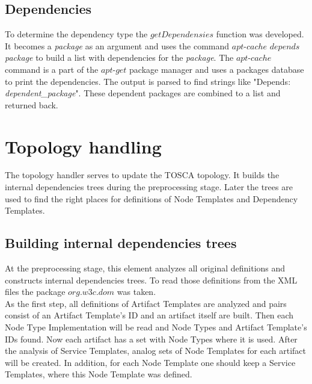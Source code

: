 \subsection*{Dependencies}
To determine the dependency type the $getDependensies$ function was developed.
It becomes a \emph{package} as an argument and uses the command $apt$-$cache$ $depends$ \emph{package} to build a list with dependencies for the \emph{package}. 
The $apt$-$cache$ command is a part of the $apt$-$get$ package manager and uses a packages database to print the dependencies.
The output is parsed to find strings like "Depends: \emph{dependent\_package}".
These dependent packages are combined to a list and returned back.

\section{Topology handling}\label{sec:imptophan}
The topology handler serves to update the TOSCA topology.
It builds the internal dependencies trees during the preprocessing stage.
Later the trees are used to find the right places for definitions of Node Templates and Dependency Templates.

\subsection*{Building internal dependencies trees}
At the preprocessing stage, this element analyzes all original definitions and constructs internal dependencies trees. %
To read those definitions from the XML files the package $org$.$w3c$.$dom$ was taken.\\
As the first step, all definitions of Artifact Templates are analyzed and pairs consist of an Artifact Template's ID and an artifact itself are built.
Then each Node Type Implementation will be read and Node Types and Artifact Template's IDs found. 
Now each artifact has a set with Node Types where it is used.
After the analysis of Service Templates, analog sets of Node Templates for each artifact will be created. 
In addition, for each Node Template one should keep a Service Templates, where this Node Template was defined.	

